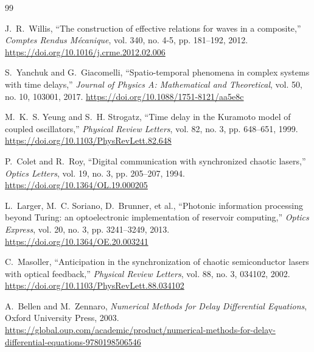 \documentclass[11pt,a4paper]{article}
\begin{document}
\begin{thebibliography}{99}

J.~R.~Willis,
``The construction of effective relations for waves in a composite,''
\emph{Comptes Rendus Mécanique}, vol. 340, no. 4-5, pp. 181--192, 2012.
\url{https://doi.org/10.1016/j.crme.2012.02.006}

S.~Yanchuk and G.~Giacomelli,
``Spatio-temporal phenomena in complex systems with time delays,''
\emph{Journal of Physics A: Mathematical and Theoretical}, vol. 50, no. 10, 103001, 2017.
\url{https://doi.org/10.1088/1751-8121/aa5e8c}

M.~K.~S. Yeung and S.~H. Strogatz,
``Time delay in the Kuramoto model of coupled oscillators,''
\emph{Physical Review Letters}, vol. 82, no. 3, pp. 648--651, 1999.
\url{https://doi.org/10.1103/PhysRevLett.82.648}

P.~Colet and R.~Roy,
``Digital communication with synchronized chaotic lasers,''
\emph{Optics Letters}, vol. 19, no. 3, pp. 205--207, 1994.
\url{https://doi.org/10.1364/OL.19.000205}

L.~Larger, M.~C. Soriano, D.~Brunner, et al.,
``Photonic information processing beyond Turing: an optoelectronic implementation of reservoir computing,''
\emph{Optics Express}, vol. 20, no. 3, pp. 3241--3249, 2013.
\url{https://doi.org/10.1364/OE.20.003241}

C.~Masoller,
``Anticipation in the synchronization of chaotic semiconductor lasers with optical feedback,''
\emph{Physical Review Letters}, vol. 88, no. 3, 034102, 2002.
\url{https://doi.org/10.1103/PhysRevLett.88.034102}

A.~Bellen and M.~Zennaro,
\emph{Numerical Methods for Delay Differential Equations},
Oxford University Press, 2003.
\url{https://global.oup.com/academic/product/numerical-methods-for-delay-differential-equations-9780198506546}



\end{thebibliography}
\end{document}
